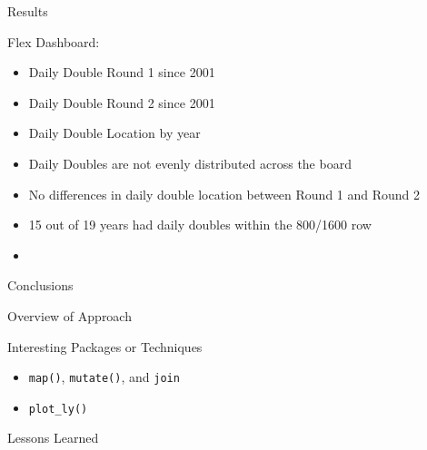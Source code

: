 \documentclass[
  ignorenonframetext,
]{beamer}
\providecommand{\tightlist}{%
  \setlength{\itemsep}{0pt}\setlength{\parskip}{0pt}}
\begin{document}
\begin{frame}{Results}
\protect\hypertarget{results}{}

Flex Dashboard:

\begin{itemize}
\item
  Daily Double Round 1 since 2001
\item
  Daily Double Round 2 since 2001
\item
  Daily Double Location by year
\item
  Daily Doubles are not evenly distributed across the board
\item
  No differences in daily double location between Round 1 and Round 2
\item
  15 out of 19 years had daily doubles within the 800/1600 row
\item
\end{itemize}

\end{frame}

\begin{frame}{Conclusions}
\protect\hypertarget{conclusions}{}

\end{frame}

\begin{frame}{Overview of Approach}
\protect\hypertarget{overview-of-approach}{}

\end{frame}

\begin{frame}[fragile]{Interesting Packages or Techniques}
\protect\hypertarget{interesting-packages-or-techniques}{}

\begin{itemize}
\tightlist
\item
  \texttt{map()}, \texttt{mutate()}, and \texttt{join}
\item
  \texttt{plot\_ly()}
\end{itemize}

\end{frame}

\begin{frame}{Lessons Learned}
\protect\hypertarget{lessons-learned}{}

\end{frame}
\end{document}
